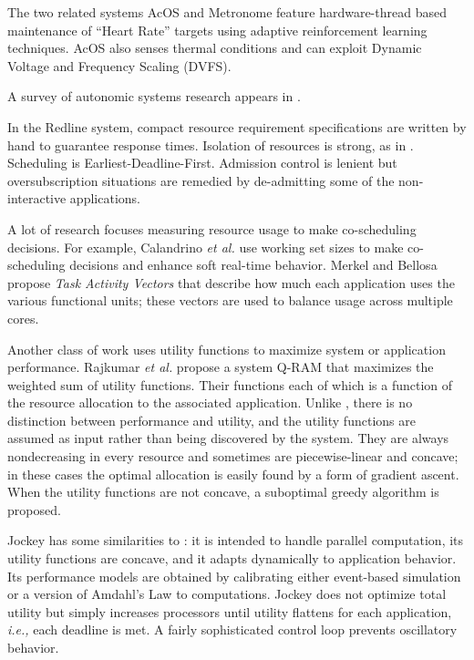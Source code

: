 %
The two related systems AcOS\cite{AcOS} and Metronome\cite{Metronome} feature hardware-thread based maintenance of ``Heart Rate''
targets using adaptive reinforcement learning techniques.
AcOS also senses thermal conditions and can exploit Dynamic Voltage and Frequency Scaling (DVFS).



A survey of autonomic systems research appears in \cite{1380585}.

In the Redline system\cite{Redline}, compact resource requirement specifications are written by hand to guarantee response times.
Isolation of resources is strong, as in \pacora.  Scheduling is Earliest-Deadline-First.
Admission control is lenient but oversubscription situations are remedied by de-admitting some of the non-interactive applications.


A lot of research focuses measuring resource usage to make co-scheduling decisions.
For example, Calandrino \emph{et al.}\cite{unc} use working set sizes to make co-scheduling decisions and enhance soft real-time behavior. Merkel and Bellosa\cite{merkel-eurosys08} propose \emph{Task Activity Vectors} that describe how much each application uses the various functional units; these vectors are used to balance usage across multiple cores.

Another class of work uses utility functions to maximize system or application performance. Rajkumar \emph{et al.}\cite{828990} propose a system Q-RAM that maximizes the weighted sum of utility functions. Their functions
each of which is a function of the resource allocation to the associated application.
Unlike \pacora, there is no distinction between performance and utility, and
the utility functions are assumed as input rather than being discovered by the system.
They are always nondecreasing in every resource and sometimes are piecewise-linear and concave;
in these cases the optimal allocation is easily found by a form of gradient ascent.
When the utility functions are not concave, a suboptimal greedy algorithm is proposed.

Jockey\cite{Jockey} has some similarities to \pacora: it is intended to handle parallel computation, its utility functions are concave,
and it adapts dynamically to application behavior.
Its performance models are obtained by calibrating either event-based simulation or a version of Amdahl's Law to computations.
Jockey does not optimize total utility but simply increases processors until utility flattens for each application,
\emph{i.e.,} each deadline is met.
A fairly sophisticated control loop prevents oscillatory behavior.




